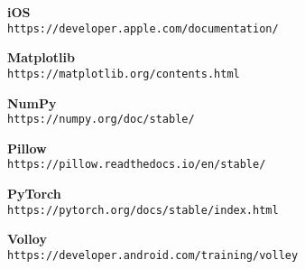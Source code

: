 \documentclass[../Report.tex]{subfiles}
\begin{document}
\begin{thebibliography}{9}
    \textbf{iOS}
    \\\texttt{https://developer.apple.com/documentation/}

    \textbf{Matplotlib}
    \\\texttt{https://matplotlib.org/contents.html}

    \textbf{NumPy}
    \\\texttt{https://numpy.org/doc/stable/}

    \textbf{Pillow}
    \\\texttt{https://pillow.readthedocs.io/en/stable/}

    \textbf{PyTorch}
    \\\texttt{https://pytorch.org/docs/stable/index.html}

    \textbf{Volloy}
    \\\texttt{https://developer.android.com/training/volley}


\end{thebibliography}
\end{document}

